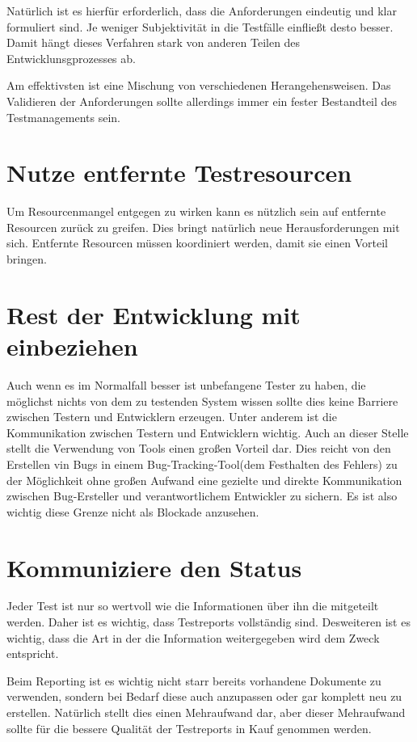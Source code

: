 Nat\"urlich ist es hierf\"ur erforderlich, dass die Anforderungen eindeutig und klar formuliert sind. Je weniger Subjektivit\"at in die Testf\"alle einfließt desto besser. Damit h\"angt dieses Verfahren stark von anderen Teilen des Entwicklunsgprozesses ab.

Am effektivsten ist eine Mischung von verschiedenen Herangehensweisen. Das Validieren der Anforderungen sollte allerdings immer ein fester Bestandteil des Testmanagements sein.

\section{Nutze entfernte Testresourcen}
Um Resourcenmangel entgegen zu wirken kann es n\"utzlich sein auf entfernte Resourcen zur\"uck zu greifen. Dies bringt nat\"urlich neue Herausforderungen mit sich. Entfernte Resourcen m\"ussen koordiniert werden, damit sie einen Vorteil bringen.

\section{Rest der Entwicklung mit einbeziehen}
Auch wenn es im Normalfall besser ist unbefangene Tester zu haben, die m\"oglichst nichts von dem zu testenden System wissen sollte dies keine Barriere zwischen Testern und Entwicklern erzeugen. Unter anderem ist die Kommunikation zwischen Testern und Entwicklern wichtig. Auch an dieser Stelle stellt die Verwendung von Tools einen großen Vorteil dar. Dies reicht von den Erstellen vin Bugs in einem Bug-Tracking-Tool(dem Festhalten des Fehlers) zu der M\"oglichkeit ohne großen Aufwand eine gezielte und direkte Kommunikation zwischen Bug-Ersteller und verantwortlichem Entwickler zu sichern. Es ist also wichtig diese Grenze nicht als Blockade anzusehen.

\section{Kommuniziere den Status}
Jeder Test ist nur so wertvoll wie die Informationen \"uber ihn die mitgeteilt werden. Daher ist es wichtig, dass Testreports vollst\"andig sind. Desweiteren ist es wichtig, dass die Art in der die Information weitergegeben wird dem Zweck entspricht.

Beim Reporting ist es wichtig nicht starr bereits vorhandene Dokumente zu verwenden, sondern bei Bedarf diese auch anzupassen oder gar komplett neu zu erstellen. Nat\"urlich stellt dies einen Mehraufwand dar, aber dieser Mehraufwand sollte f\"ur die bessere Qualit\"at der Testreports in Kauf genommen werden.

